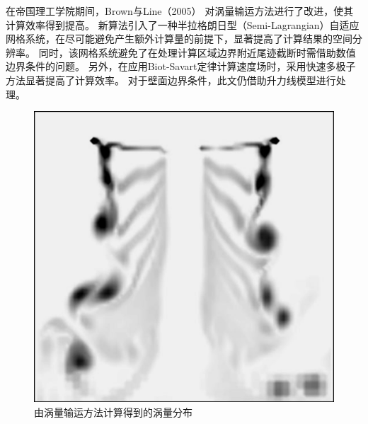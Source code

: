 \documentclass[doctor,openright,twoside,color]{buaathesis}
\begin{document}
在帝国理工学院期间，Brown与Line（2005）
对涡量输运方法进行了改进，使其计算效率得到提高。
新算法引入了一种半拉格朗日型（Semi-Lagrangian）自适应网格系统，在尽可能避免产生额外计算量的前提下，显著提高了计算结果的空间分辨率。
同时，该网格系统避免了在处理计算区域边界附近尾迹截断时需借助数值边界条件的问题。
另外，在应用Biot-Savart定律计算速度场时，采用快速多极子方法显著提高了计算效率。
对于壁面边界条件，此文仍借助升力线模型进行处理。
\begin{figure}[t!]
    \centering
    \includegraphics[height=0.3\textheight]{figures/vtm.jpg}
    \caption{由涡量输运方法计算得到的涡量分布}\label{vtm}
\end{figure}
\end{document}
